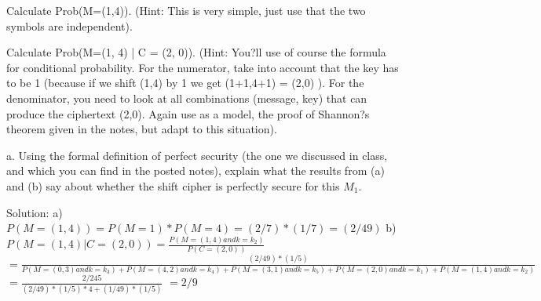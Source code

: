 \documentclass[12pt,letterpaper,final]{report}
\begin{document}
\bigskip
{}
\begin{alphalist}
	\item Calculate Prob(M=(1,4)). (Hint: This is very simple, just use that the two symbols are independent).
	\item Calculate Prob(M=(1, 4) | C = (2, 0)). (Hint: You?ll use of course the formula for conditional probability. For the numerator, take into account that the key has to be 1 (because if we shift (1,4) by 1 we get (1+1,4+1) = (2,0) ). For the denominator, you need to look at all combinations (message, key) that can produce the ciphertext (2,0).  Again use as a model, the proof of Shannon?s theorem given in the notes, but adapt to this situation).
	\item a.	Using the formal definition of perfect security (the one we discussed in class, and which you can find in the posted notes), explain what the results from (a) and (b) say about whether the shift cipher is perfectly secure for this $M_{1}$.
\end{alphalist}


\bigskip Solution: 
\newline a) $P(M=(1,4)) = P(M=1) * P(M=4) = (2/7)*(1/7) = (2/49)$
\newline b)
\newline $P(M=(1,4) | C=(2,0)) = \frac{P(M=(1,4) and k=k_2)}{P(C=(2,0))}$
\newline $=\frac{(2/49)*(1/5)}{P(M=(0,3) and k=k_3) + P(M=(4,2) and k=k_4) + P(M=(3,1) and k=k_5) + P(M=(2,0) and k=k_1) + P(M=(1,4) and k=k_2)}$
\newline $=\frac{2/245}{(2/49)*(1/5)*4 + (1/49)*(1/5)}$
\newline $=2/9$
\bigskip
\end{document}
